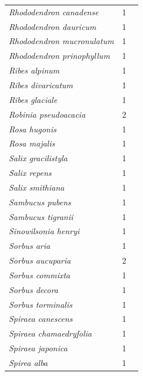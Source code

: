 \documentclass[11pt]{article}
\begin{document}
\begin{longtable}{p{}p{}p{}}
  \emph{Rhododendron canadense} &   1 & \emph{\citep{zohner2016}} \\ 
  \emph{Rhododendron dauricum} &   1 & \emph{\citep{zohner2016}} \\ 
  \emph{Rhododendron mucronulatum} &   1 & \emph{\citep{zohner2016}} \\ 
  \emph{Rhododendron prinophyllum} &   1 & \emph{\citep{flynn2018}} \\ 
  \emph{Ribes alpinum} &   1 & \emph{\citep{zohner2016}} \\ 
  \emph{Ribes divaricatum} &   1 & \emph{\citep{zohner2016}} \\ 
  \emph{Ribes glaciale} &   1 & \emph{\citep{zohner2016}} \\ 
  \emph{Robinia pseudoacacia} &   2 & \emph{\citep{Laube:2014a,Laube:2014b}} \\ 
  \emph{Rosa hugonis} &   1 & \emph{\citep{zohner2016}} \\ 
  \emph{Rosa majalis} &   1 & \emph{\citep{zohner2016}} \\ 
  \emph{Salix gracilistyla} &   1 & \emph{\citep{zohner2016}} \\ 
  \emph{Salix repens} &   1 & \emph{\citep{zohner2016}} \\ 
  \emph{Salix smithiana} &   1 & \emph{\citep{Caffarra:2011a}} \\ 
  \emph{Sambucus pubens} &   1 & \emph{\citep{zohner2016}} \\ 
  \emph{Sambucus tigranii} &   1 & \emph{\citep{zohner2016}} \\ 
  \emph{Sinowilsonia henryi} &   1 & \emph{\citep{zohner2016}} \\ 
  \emph{Sorbus aria} &   1 & \emph{\citep{zohner2016}} \\ 
  \emph{Sorbus aucuparia} &   2 & \emph{\citep{Basler:2012,Heide:1993}} \\ 
  \emph{Sorbus commixta} &   1 & \emph{\citep{zohner2016}} \\ 
  \emph{Sorbus decora} &   1 & \emph{\citep{zohner2016}} \\ 
  \emph{Sorbus torminalis} &   1 & \emph{\citep{malyshev2018}} \\ 
  \emph{Spiraea canescens} &   1 & \emph{\citep{zohner2016}} \\ 
  \emph{Spiraea chamaedryfolia} &   1 & \emph{\citep{zohner2016}} \\ 
  \emph{Spiraea japonica} &   1 & \emph{\citep{zohner2016}} \\ 
  \emph{Spirea alba} &   1 & \emph{\citep{flynn2018}} \\ 

\end{longtable}
\end{document}
